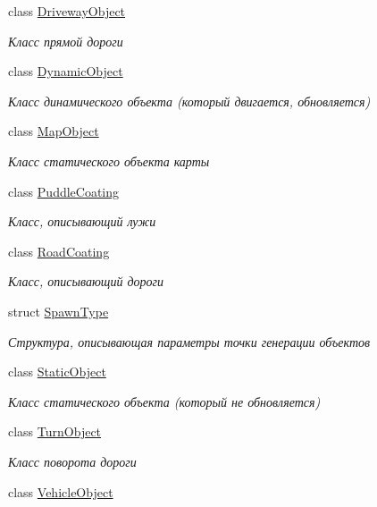 \begin{DoxyCompactItemize}
class \hyperlink{classrtm_1_1_driveway_object}{Driveway\+Object}
\begin{DoxyCompactList}\small\item\em Класс прямой дороги \end{DoxyCompactList}\item 
class \hyperlink{classrtm_1_1_dynamic_object}{Dynamic\+Object}
\begin{DoxyCompactList}\small\item\em Класс динамического объекта (который двигается, обновляется) \end{DoxyCompactList}\item 
class \hyperlink{classrtm_1_1_map_object}{Map\+Object}
\begin{DoxyCompactList}\small\item\em Класс статического объекта карты \end{DoxyCompactList}\item 
class \hyperlink{classrtm_1_1_puddle_coating}{Puddle\+Coating}
\begin{DoxyCompactList}\small\item\em Класс, описывающий лужи \end{DoxyCompactList}\item 
class \hyperlink{classrtm_1_1_road_coating}{Road\+Coating}
\begin{DoxyCompactList}\small\item\em Класс, описывающий дороги \end{DoxyCompactList}\item 
struct \hyperlink{structrtm_1_1_spawn_type}{Spawn\+Type}
\begin{DoxyCompactList}\small\item\em Структура, описывающая параметры точки генерации объектов \end{DoxyCompactList}\item 
class \hyperlink{classrtm_1_1_static_object}{Static\+Object}
\begin{DoxyCompactList}\small\item\em Класс статического объекта (который не обновляется) \end{DoxyCompactList}\item 
class \hyperlink{classrtm_1_1_turn_object}{Turn\+Object}
\begin{DoxyCompactList}\small\item\em Класс поворота дороги \end{DoxyCompactList}\item 
class \hyperlink{classrtm_1_1_vehicle_object}{Vehicle\+Object}

\end{DoxyCompactItemize}
